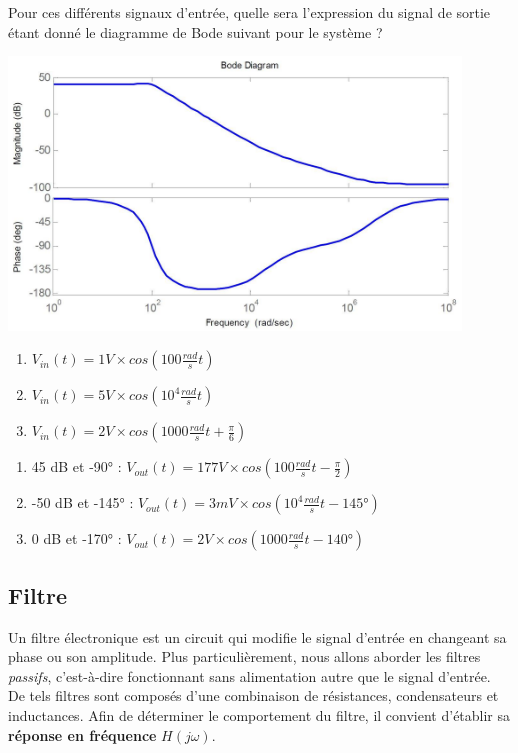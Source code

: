 {
Pour ces différents signaux d'entrée, quelle sera l'expression du signal de sortie étant donné le diagramme de Bode suivant pour le système ?
\begin{center}
\includegraphics[width=12cm]{exo_bode}
\end{center}

\begin{enumerate}
\item $V_{in}(t)=1V\times cos(100\frac{rad}{s}t)$
\item $V_{in}(t)=5V\times cos(10^4\frac{rad}{s}t)$
\item $V_{in}(t)=2V\times cos(1000\frac{rad}{s}t+\frac{\pi}{6})$
\end{enumerate}
}
{
  \begin{enumerate}
    \item 45 dB et -90° : $V_{out}(t) = 177 V \times cos(100\frac{rad}{s}t - \frac{\pi}{2})$
    \item -50 dB et -145° : $V_{out}(t) = 3 mV\times cos(10^4\frac{rad}{s}t - 145°)$
    \item 0 dB et -170° : $V_{out}(t) = 2 V\times cos(1000\frac{rad}{s}t - 140°)$
  \end{enumerate}
}


\subsection{Filtre}
Un filtre électronique est un circuit  qui modifie le signal d'entrée en changeant sa phase ou son amplitude.
Plus particulièrement, nous allons aborder les filtres \textit{passifs}, c'est-à-dire fonctionnant sans alimentation autre que le signal d'entrée.
De tels filtres sont composés d'une combinaison de résistances, condensateurs et inductances.
Afin de déterminer le comportement du filtre, il convient d'établir sa \textbf{réponse en fréquence} $H(j\omega)$.

